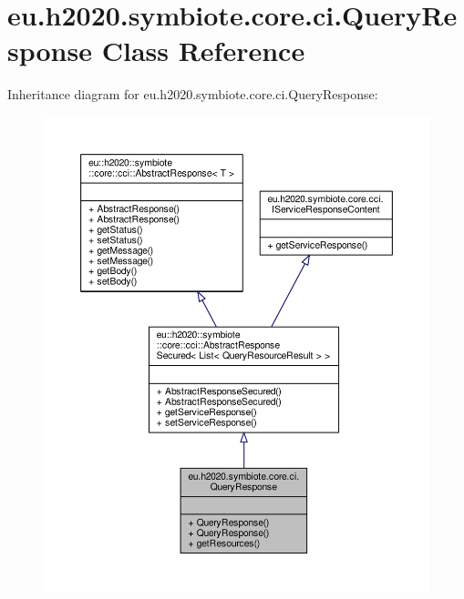 \hypertarget{classeu_1_1h2020_1_1symbiote_1_1core_1_1ci_1_1QueryResponse}{}\section{eu.\+h2020.\+symbiote.\+core.\+ci.\+Query\+Response Class Reference}
\label{classeu_1_1h2020_1_1symbiote_1_1core_1_1ci_1_1QueryResponse}


Inheritance diagram for eu.\+h2020.\+symbiote.\+core.\+ci.\+Query\+Response\+:
\nopagebreak
\begin{figure}[H]
\begin{center}
\leavevmode
\includegraphics[width=350pt]{classeu_1_1h2020_1_1symbiote_1_1core_1_1ci_1_1QueryResponse__inherit__graph}
\end{center}
\end{figure}


